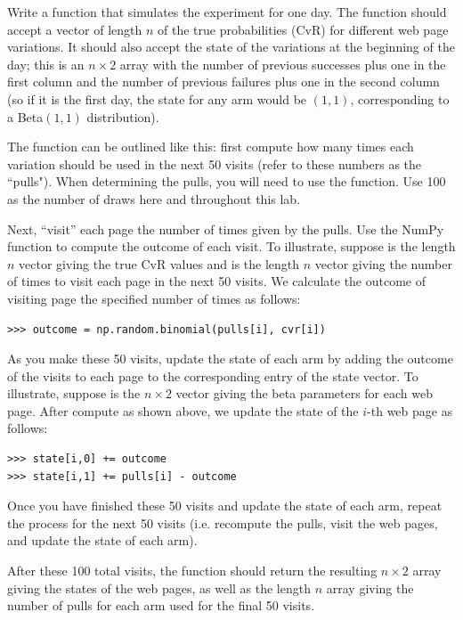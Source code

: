 \begin{problem}
Write a function  that simulates the experiment for one day.
The function should accept a vector of length $n$ of the true probabilities (CvR)
for different web page variations.  It should also accept the state of the variations
at the beginning of the day; this is an $n \times 2$ array with the number of previous
successes plus one in the first column and the number of previous failures plus one in
the second column (so if it is the first day, the state for any arm would be $(1,1)$,
corresponding to a Beta$(1,1)$ distribution).

The function can be outlined like this: first compute how many times each variation
should be used in the next 50 visits (refer to these numbers as the ``pulls").
When determining the pulls, you will need to use
the  function.  Use 100 as the number of draws here and throughout this lab.

Next, ``visit'' each page the number of times given by the pulls.
Use the NumPy function  to compute the outcome of each visit.
To illustrate, suppose  is the length $n$ vector giving the true CvR values
and  is the length $n$ vector giving the number of times to visit each page
in the next 50 visits. We calculate the outcome of visiting page  the
specified number of times as follows:
\begin{lstlisting}
>>> outcome = np.random.binomial(pulls[i], cvr[i])
\end{lstlisting}

As you make these 50 visits, update the state of each arm by adding the outcome of the visits
to each page to the corresponding entry of the state vector.
To illustrate, suppose  is the $n \times 2$ vector giving the beta parameters
for each web page. After compute  as shown above, we update the
state of the $i$-th web page as follows:
\begin{lstlisting}
>>> state[i,0] += outcome
>>> state[i,1] += pulls[i] - outcome
\end{lstlisting}

Once you have finished these 50 visits and update the state of each arm,
repeat the process for the next 50 visits (i.e. recompute the pulls,
visit the web pages, and update the state of each arm).

After these 100 total visits,
the function should return the resulting $n\times 2$ array giving the states of the web pages,
as well as the length $n$ array giving the number of pulls for each arm used for the final
50 visits.
\end{problem}

